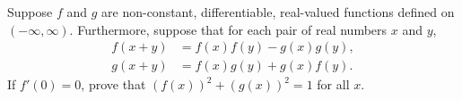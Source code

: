 Suppose $f$ and $g$ are non-constant, differentiable, real-valued
functions defined on $(-\infty, \infty)$. Furthermore, suppose that for
each pair of real numbers $x$ and $y$,
\begin{align*}
f(x+y) &= f(x)f(y) - g(x)g(y), \\
g(x+y) &= f(x)g(y) + g(x)f(y).
\end{align*}
If $f'(0) = 0$, prove that $(f(x))^2 + (g(x))^2 = 1$ for all $x$.
